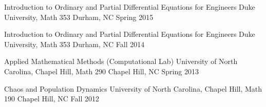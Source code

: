
\begin{cventries}

  \cventry
    {Introduction to Ordinary and Partial Differential Equations for Engineers} %
    {Duke University, Math 353} %
    {Durham, NC} %
    {Spring 2015} %
     {
     }

  \cventry
    {Introduction to Ordinary and Partial Differential Equations for Engineers} %
    {Duke University, Math 353} %
    {Durham, NC} %
    {Fall 2014} %
     {
     }

  \cventry
    {Applied Mathematical Methods (Computational Lab)} %
    {University of North Carolina, Chapel Hill, Math 290} %
    {Chapel Hill, NC} %
    {Spring 2013} %
     {
     }

  \cventry
    {Chaos and Population Dynamics } %
    {University of North Carolina, Chapel Hill, Math 190} %
    {Chapel Hill, NC} %
    {Fall 2012} %
     {
     }



\end{cventries}
